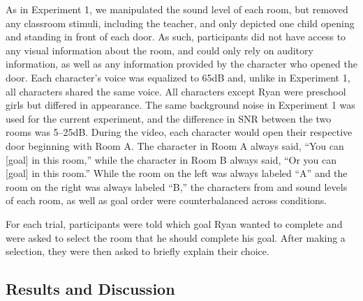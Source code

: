 \documentclass[10pt, letterpaper]{article}
\begin{document}
As in Experiment 1, we manipulated the sound level of each room, but
removed any classroom stimuli, including the teacher, and only depicted
one child opening and standing in front of each door. As such,
participants did not have access to any visual information about the
room, and could only rely on auditory information, as well as any
information provided by the character who opened the door. Each
character's voice was equalized to 65dB and, unlike in Experiment 1, all
characters shared the same voice. All characters except Ryan were
preschool girls but differed in appearance. The same background noise in
Experiment 1 was used for the current experiment, and the difference in
SNR between the two rooms was 5--25dB. During the video, each character
would open their respective door beginning with Room A. The character in
Room A always said, ``You can {[}goal{]} in this room,'' while the
character in Room B always said, ``Or you can {[}goal{]} in this room.''
While the room on the left was always labeled ``A'' and the room on the
right was always labeled ``B,'' the characters from and sound levels of
each room, as well as goal order were counterbalanced across conditions.

For each trial, participants were told which goal Ryan wanted to
complete and were asked to select the room that he should complete his
goal. After making a selection, they were then asked to briefly explain
their choice.

\hypertarget{results-and-discussion-2}{%
\subsection{Results and Discussion}\label{results-and-discussion-2}}
\end{document}
